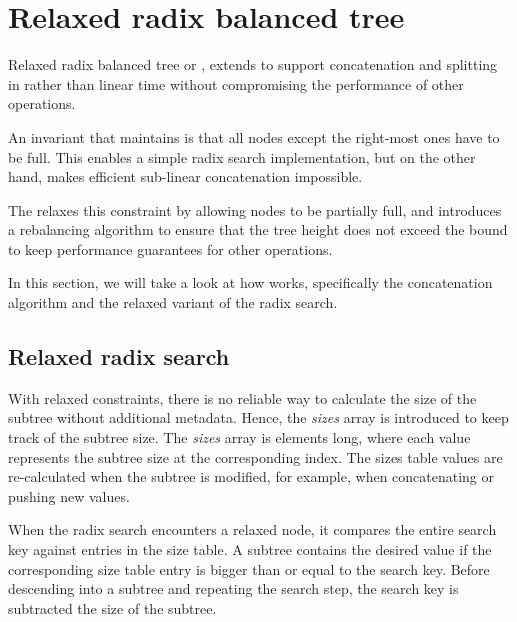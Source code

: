 \section{Relaxed radix balanced tree}


Relaxed radix balanced tree or \treerrb{}, extends \treerb{} to support concatenation and splitting in  rather than linear time without compromising the performance of other operations.

An invariant that \treerb{} maintains is that all nodes except the right-most ones have to be full. This enables a simple radix search implementation, but on the other hand, makes efficient sub-linear concatenation impossible.

The \treerrb{} relaxes this constraint by allowing nodes to be partially full, and introduces a rebalancing algorithm to ensure that the tree height does not exceed the  bound to keep performance guarantees for other operations.

In this section, we will take a look at how \treerrb{} works, specifically the concatenation algorithm and the relaxed variant of the radix search.

\subsection{Relaxed radix search}
With relaxed \treerrb{} constraints, there is no reliable way to calculate the size of the subtree without additional metadata. Hence, the \emph{sizes} array is introduced to keep track of the subtree size. The \emph{sizes} array is \m{} elements long, where each value represents the subtree size at the corresponding index. The sizes table values are re-calculated when the subtree is modified, for example, when concatenating or pushing new values.

When the radix search encounters a relaxed node, it compares the entire search key against entries in the size table. A subtree contains the desired value if the corresponding size table entry is bigger than or equal to the search key. Before descending into a subtree and repeating the search step, the search key is subtracted the size of the subtree.

